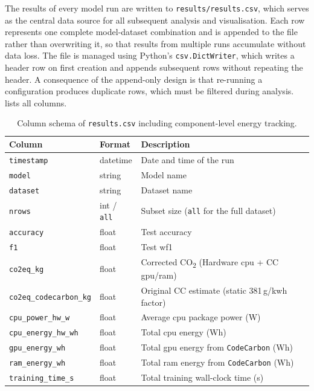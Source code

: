 The results of every model run are written to \texttt{results/results.csv}, which serves as the central data source for all subsequent analysis and visualisation. Each row represents one complete model-dataset combination and is appended to the file rather than overwriting it, so that results from multiple runs accumulate without data loss. The file is managed using Python's \texttt{csv.DictWriter}, which writes a header row on first creation and appends subsequent rows without repeating the header. A consequence of the append-only design is that re-running a configuration produces duplicate rows, which must be filtered during analysis.  lists all columns.

\begin{table}[htbp]
\centering
\small
\caption[Column schema of \texttt{results.csv}.]{Column schema of \texttt{results.csv} including component-level energy tracking.}
\label{tab:results_schema}
\begin{tabular}{lll}
\toprule
\textbf{Column} & \textbf{Format} & \textbf{Description} \\
\midrule
\texttt{timestamp}             & datetime & Date and time of the run \\
\texttt{model}                 & string   & Model name \\
\texttt{dataset}               & string   & Dataset name \\
\texttt{nrows}                 & int / \texttt{all} & Subset size (\texttt{all} for the full dataset) \\
\texttt{accuracy}              & float    & Test accuracy \\
\texttt{f1}                    & float    & Test \gls{wf1} \\
\texttt{co2eq\_kg}             & float    & Corrected CO\textsubscript{2} (Hardware \gls{cpu} + CC \gls{gpu}/\gls{ram}) \\
\texttt{co2eq\_codecarbon\_kg} & float    & Original CC estimate (static 381\,g/\gls{kwh} factor) \\
\texttt{cpu\_power\_hw\_w}     & float    & Average \gls{cpu} package power (W) \\
\texttt{cpu\_energy\_hw\_wh}   & float    & Total \gls{cpu} energy (Wh) \\
\texttt{gpu\_energy\_wh}       & float    & Total \gls{gpu} energy from \texttt{CodeCarbon} (Wh) \\
\texttt{ram\_energy\_wh}       & float    & Total \gls{ram} energy from \texttt{CodeCarbon} (Wh) \\
\texttt{training\_time\_s}     & float    & Total training wall-clock time (s) \\
\bottomrule
\end{tabular}
\end{table}

